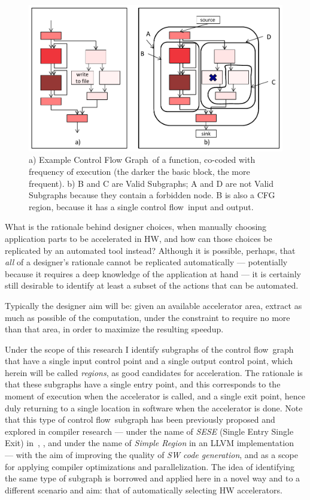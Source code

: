 \documentclass[]{usiinfthesis}
\newcommand{\controlflow}{control flow}
\newcommand{\CFG}{Control Flow Graph}
\begin{document}
\begin{figure}[t]
\centering
\includegraphics[width= .7 \linewidth]{Figs/cfg_example}
\caption{a) Example \CFG\ of a function, co-coded with frequency
  of execution (the darker the basic block, the more frequent). b) B
  and C are Valid Subgraphs; A and D are not Valid Subgraphs because
  they contain a forbidden node. B is also a CFG region, because it has a
  single \controlflow\ input and output.}
\label{fig:cfg-example}
\end{figure}


What is the rationale behind designer choices, when manually choosing
application parts to be accelerated in HW, and how can those choices
be replicated by an automated tool instead? Although it is possible,
perhaps, that \emph{all} of a designer's rationale cannot be
replicated automatically --- potentially because it requires a deep
knowledge of the application at hand --- it is certainly still
desirable to identify at least a subset of the actions that can be
automated.\par

Typically the designer aim will be: given an available accelerator
area, extract as much as possible of the computation, under the
constraint to require no more than that area, in order to maximize the
resulting speedup.\par 

Under the scope of this research I identify subgraphs of the \controlflow\ 
graph that have a single input control point and a single output control point, 
which herein will be called \emph{regions}, as good candidates for 
acceleration. The rationale
is that these subgraphs have a single entry point, and this
corresponds to the moment of execution when the accelerator is called,
and a single exit point, hence duly returning to a single location in
software when the accelerator is done. Note that this type of
\controlflow\ subgraph has been previously proposed and explored in
compiler research --- under the name of \emph{SESE} (Single Entry
Single Exit) in~\cite{AguilarJune16}, \cite{JohnsonJun94}, and under
the name of \emph{Simple Region} in an LLVM
implementation~\cite{LattnerMar04} --- with the aim of improving the
quality of \emph{SW code generation}, and as a scope for applying
compiler optimizations and parallelization. The idea of
identifying the same type of subgraph is borrowed and applied here in a 
novel way and to a different scenario and aim: that of automatically 
selecting HW accelerators.\par
\end{document}
